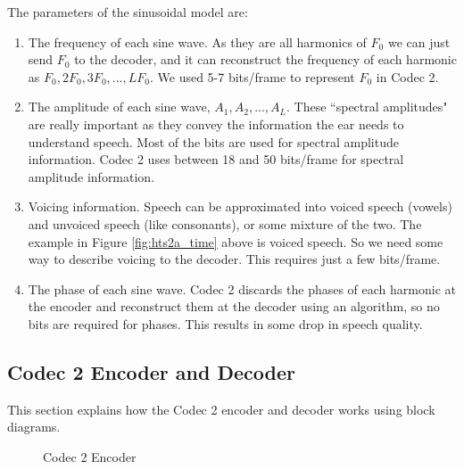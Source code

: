 \documentclass{article}
\begin{document}
The parameters of the sinusoidal model are:
\begin{enumerate}
\item The frequency of each sine wave.  As they are all harmonics of $F_0$ we can just send $F_0$ to the decoder, and it can reconstruct the frequency of each harmonic as $F_0,2F_0,3F_0,...,LF_0$.  We used 5-7 bits/frame to represent $F_0$ in Codec 2.
\item The amplitude of each sine wave, $A_1,A_2,...,A_L$.  These ``spectral amplitudes" are really important as they convey the information the ear needs to understand speech.  Most of the bits are used for spectral amplitude information.  Codec 2 uses between 18 and 50 bits/frame for spectral amplitude information.
\item Voicing information.  Speech can be approximated into voiced speech (vowels) and unvoiced speech (like consonants), or some mixture of the two.  The example in Figure \ref{fig:hts2a_time} above is voiced speech.  So we need some way to describe voicing to the decoder. This requires just a few bits/frame.
\item The phase of each sine wave.  Codec 2 discards the phases of each harmonic at the encoder and reconstruct them at the decoder using an algorithm, so no bits are required for phases.  This results in some drop in speech quality.
\end{enumerate}

\subsection{Codec 2 Encoder and Decoder}

This section explains how the Codec 2 encoder and decoder works using block diagrams.

\begin{figure}[h]
\caption{Codec 2 Encoder}
\label{fig:codec2_encoder}
\begin{center}
\end{center}
\end{figure}
\end{document}
